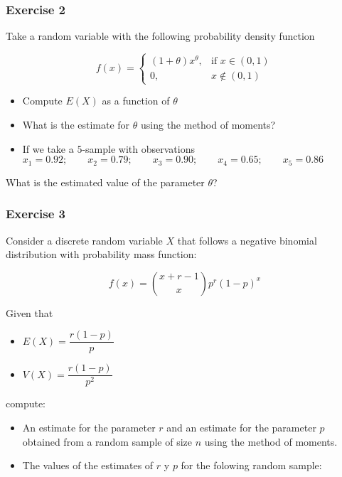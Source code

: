 \documentclass[
]{book}
\providecommand{\tightlist}{%
  \setlength{\itemsep}{0pt}\setlength{\parskip}{0pt}}
\begin{document}
\hypertarget{exercise-2-8}{%
\subsubsection{Exercise 2}\label{exercise-2-8}}

Take a random variable with the following probability density function

\[
f(x)=
\begin{cases}
    (1+\theta)x^\theta,& \text{if } x\in (0,1)\\
    0,& x\notin (0,1)
\end{cases}
\]

\begin{itemize}
\tightlist
\item
  Compute \(E(X)\) as a function of \(\theta\)
\item
  What is the estimate for \(\theta\) using the method of moments?
\item
  If we take a \(5\)-sample with observations
  \(x_1 = 0.92; \qquad x_2 = 0.79; \qquad x_3 = 0.90; \qquad x_4 = 0.65; \qquad x_5 = 0.86\)
\end{itemize}

What is the estimated value of the parameter \(\theta\)?

\hypertarget{exercise-3-5}{%
\subsubsection{Exercise 3}\label{exercise-3-5}}

Consider a discrete random variable \(X\) that follows a negative binomial distribution with probability mass function:

\[f(x) = \binom{x+r-1}{x}p^r(1-p)^x\]

Given that

\begin{itemize}
\tightlist
\item
  \(E(X)=\dfrac{r(1-p)}{p}\)
\item
  \(V(X) =\dfrac{r(1-p)}{p^2}\)
\end{itemize}

compute:

\begin{itemize}
\item
  An estimate for the parameter \(r\) and an estimate for the parameter \(p\) obtained from a random sample of size \(n\) using the method of moments.
\item
  The values of the estimates of \(r\) y \(p\) for the folowing random sample:
\end{itemize}
\end{document}
